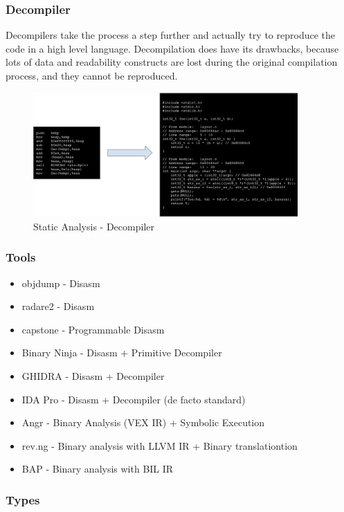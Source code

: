 \documentclass{article}
\begin{document}
\subsubsection{Decompiler}

Decompilers take the process a step further and actually try to reproduce the code in a high level language. 
Decompilation does have its drawbacks, because lots of data and readability constructs are lost during the original 
compilation process, and they cannot be reproduced.
\begin{figure}[H]
\centering
\includegraphics[width=0.9\textwidth]{img/decompiler.jpg}
\caption{Static Analysis - Decompiler}
\label{fig:decompiler}
\end{figure}

\subsubsection{Tools}

\begin{itemize}
\item objdump - Disasm
\item radare2 - Disasm
\item capstone - Programmable Disasm
\item Binary Ninja - Disasm + Primitive Decompiler
\item GHIDRA - Disasm + Decompiler
\item IDA Pro - Disasm + Decompiler (de facto standard)
\item Angr - Binary Analysis (VEX IR) + Symbolic Execution
\item rev.ng - Binary analysis with LLVM IR + Binary translationtion
\item BAP - Binary analysis with BIL IR
\end{itemize}

\subsubsection{Types}
\end{document}
